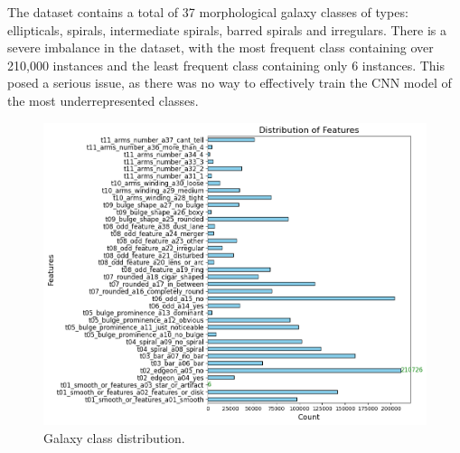 \documentclass[10pt,twocolumn,letterpaper]{article}
\begin{document}
\noindent The dataset contains a total of 37 morphological galaxy classes of types: ellipticals, spirals, intermediate spirals, barred spirals and irregulars.
There is a severe imbalance in the dataset, with the most frequent class containing over 210,000 instances and the least frequent class containing only 6 instances.
This posed a serious issue, as there was no way to effectively train the CNN model of the most underrepresented classes.
\begin{figure}[htbp]
    \includegraphics[width=\linewidth]{feature_distribution.png}
    \caption{Galaxy class distribution.}
    \label{fig:featuredist}
  \end{figure}
\end{document}
